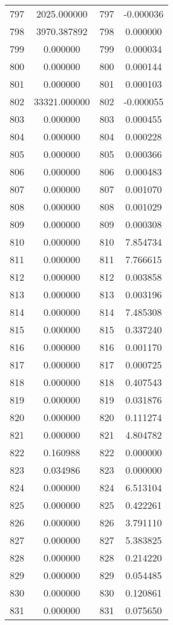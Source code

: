 \documentclass[12pt]{article}
\begin{document}
\begin{longtable}{@{}cccc@{}}
797 & 2025.000000 & 797 & -0.000036 \\
798 & 3970.387892 & 798 & 0.000000 \\
799 & 0.000000 & 799 & 0.000034 \\
800 & 0.000000 & 800 & 0.000144 \\
801 & 0.000000 & 801 & 0.000103 \\
802 & 33321.000000 & 802 & -0.000055 \\
803 & 0.000000 & 803 & 0.000455 \\
804 & 0.000000 & 804 & 0.000228 \\
805 & 0.000000 & 805 & 0.000366 \\
806 & 0.000000 & 806 & 0.000483 \\
807 & 0.000000 & 807 & 0.001070 \\
808 & 0.000000 & 808 & 0.001029 \\
809 & 0.000000 & 809 & 0.000308 \\
810 & 0.000000 & 810 & 7.854734 \\
811 & 0.000000 & 811 & 7.766615 \\
812 & 0.000000 & 812 & 0.003858 \\
813 & 0.000000 & 813 & 0.003196 \\
814 & 0.000000 & 814 & 7.485308 \\
815 & 0.000000 & 815 & 0.337240 \\
816 & 0.000000 & 816 & 0.001170 \\
817 & 0.000000 & 817 & 0.000725 \\
818 & 0.000000 & 818 & 0.407543 \\
819 & 0.000000 & 819 & 0.031876 \\
820 & 0.000000 & 820 & 0.111274 \\
821 & 0.000000 & 821 & 4.804782 \\
822 & 0.160988 & 822 & 0.000000 \\
823 & 0.034986 & 823 & 0.000000 \\
824 & 0.000000 & 824 & 6.513104 \\
825 & 0.000000 & 825 & 0.422261 \\
826 & 0.000000 & 826 & 3.791110 \\
827 & 0.000000 & 827 & 5.383825 \\
828 & 0.000000 & 828 & 0.214220 \\
829 & 0.000000 & 829 & 0.054485 \\
830 & 0.000000 & 830 & 0.120861 \\
831 & 0.000000 & 831 & 0.075650 \\

\end{longtable}
\end{document}
